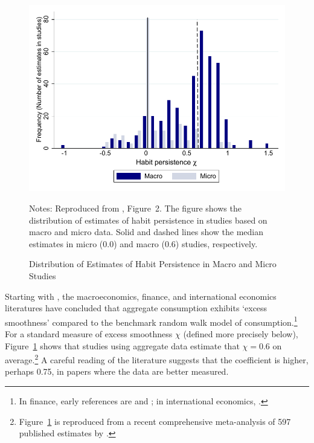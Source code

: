\begin{figure}
  \centering
\caption{Distribution of Estimates of Habit Persistence in Macro and Micro Studies}
\label{microMacroMetaHistogram}
\hypertarget{microMacroMetaHistogram}{}
    { \includegraphics[width=1.0\textwidth]{./Figures/microMacroMetaHistogram}}

    \begin{flushleft}
      \footnotesize Notes: Reproduced from \cite{hrsHabit}, Figure~2. The figure shows the distribution of estimates of habit persistence in studies based on macro and micro data. Solid and dashed lines show the median estimates in micro (0.0) and macro (0.6) studies, respectively.
      \end{flushleft}
\end{figure}

Starting with \cite{cdSmooth}, the macroeconomics, finance, and international economics literatures have concluded that aggregate consumption exhibits `excess smoothness' compared to the benchmark \cite{hallRandomWalk} random walk model of consumption.\footnote{In finance, early references are \cite{abel:aerhabits} and \cite{constantinidesHabits}; in international economics, \cite{gru04}.}  For a standard measure of excess smoothness $\chi$ (defined more precisely below), Figure~\ref{microMacroMetaHistogram} shows that studies using aggregate data estimate that $\chi=0.6$ on average.\footnote{Figure~\ref{microMacroMetaHistogram} is reproduced from a recent comprehensive meta-analysis of 597 published estimates by \cite{hrsHabit}.} A careful reading of the literature suggests that the coefficient is higher, perhaps 0.75, in papers where the data are better measured.

